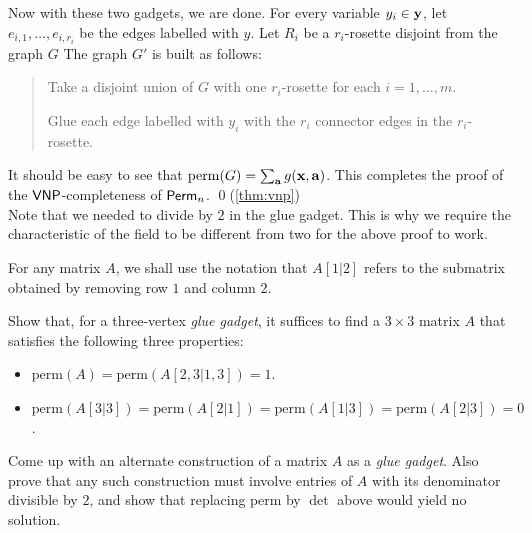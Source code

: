 Now with these two gadgets, we are done. 
For every variable $y_i \in \mathbf{y}$, let $e_{i,1}, \dots, e_{i,r_i}$ be the edges labelled with $y$. 
Let $R_i$ be a $r_i$-rosette disjoint from the graph $G$ The graph $G'$ is built as follows:
\begin{quote}
  Take a disjoint union of $G$ with one $r_i$-rosette for each $i = 1,\dots, m$. 

  Glue each edge labelled with $y_i$ with the $r_i$ connector edges in the $r_i$-rosette. 
\end{quote}

It should be easy to see that $\mathrm{perm}(G) = \sum_{\mathbf{a}} g(\mathbf{x}, \mathbf{a})$. 
This completes the proof of the $\mathsf{VNP}$-completeness of $\operatorname{\mathsf{Perm}}_n$. \qed {\footnotesize (\autoref{thm:vnp})} \\

Note that we needed to divide by $2$ in the glue gadget. 
This is why we require the characteristic of the field to be different from two for the above proof to work. 

\begin{exercise}
  For any matrix $A$, we shall use the notation that $A[1|2]$ refers to the submatrix obtained by removing row $1$ and column $2$.

  Show that, for a three-vertex \emph{glue gadget}, it suffices to find a $3\times 3$ matrix $A$ that satisfies the following three properties:
  \begin{itemize}
    \item $\mathrm{perm}(A) = \mathrm{perm}(A[2,3|1,3]) = 1$. 
    \item $\mathrm{perm}(A[3|3]) = \mathrm{perm}(A[2|1]) = \mathrm{perm}(A[1|3]) = \mathrm{perm}(A[2|3]) = 0$.
  \end{itemize}
  
  Come up with an alternate construction of a matrix $A$ as a \emph{glue gadget}. 
Also prove that any such construction must involve entries of $A$ with its denominator divisible by $2$, and show that replacing $\mathrm{perm}$ by $\det$ above would yield no solution. 
\end{exercise}
